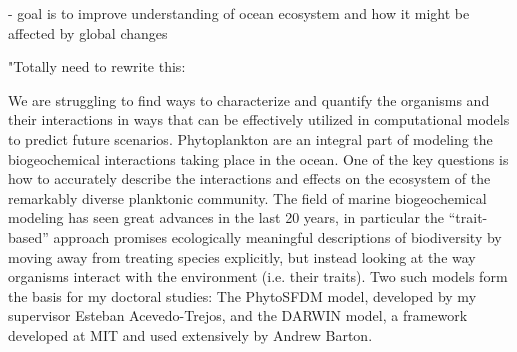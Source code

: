 \begin{titlepage}
- goal is to improve understanding of ocean ecosystem and how it might be affected by global changes

 

"Totally need to rewrite this:

 We are struggling to find ways to characterize and quantify the organisms and their interactions in ways that can be effectively utilized in computational models to predict future scenarios. Phytoplankton are an integral part of modeling the biogeochemical interactions taking place in the ocean. One of the key questions is how to accurately describe the interactions and effects on the ecosystem of the remarkably diverse planktonic community. The field of marine biogeochemical modeling has seen great advances in the last 20 years, in particular the “trait-based” approach promises ecologically meaningful descriptions of biodiversity by moving away from treating species explicitly, but instead looking at the way organisms interact with the environment (i.e. their traits). Two such models form the basis for my doctoral studies: The PhytoSFDM model, developed by my supervisor Esteban Acevedo-Trejos, and the DARWIN model, a framework developed at MIT and used extensively by Andrew Barton. 

\end{titlepage}